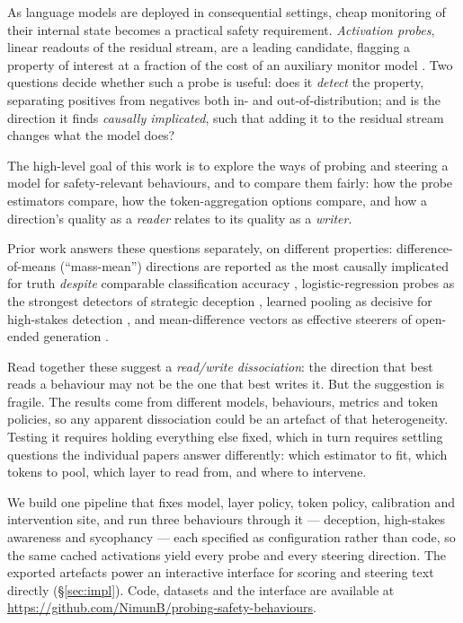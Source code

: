 \documentclass[conference]{IEEEtran}
\begin{document}
As language models are deployed in consequential settings, cheap monitoring of
their internal state becomes a practical safety requirement. \emph{Activation
probes}, linear readouts of the residual stream, are a leading candidate,
flagging a property of interest at a fraction of the cost of an auxiliary monitor
model \citep{alain2018,mckenzie2025}. Two questions decide whether such a probe is
useful: does it \emph{detect} the property, separating positives from negatives
both in- and out-of-distribution; and is the direction it finds
\emph{causally implicated}, such that adding it to the residual stream changes
what the model does?

The high-level goal of this work is to explore the ways of probing and steering
a model for safety-relevant behaviours, and to compare them fairly: how the
probe estimators compare, how the token-aggregation options compare, and how a
direction's quality as a \emph{reader} relates to its quality as a \emph{writer}.

Prior work answers these questions separately, on different properties:
difference-of-means (``mass-mean'') directions are reported as the most causally
implicated for truth \emph{despite} comparable classification accuracy
\citep{marks2024}, logistic-regression probes as the strongest detectors of
strategic deception \citep{goldowsky2025}, learned pooling as decisive for
high-stakes detection \citep{mckenzie2025}, and mean-difference vectors as
effective steerers of open-ended generation \citep{rimsky2024}.

Read together these suggest a \emph{read/write dissociation}: the direction that
best reads a behaviour may not be the one that best writes it. But the suggestion
is fragile. The results come from different models, behaviours, metrics and token
policies, so any apparent dissociation could be an artefact of that heterogeneity.
Testing it requires holding everything else fixed, which in turn requires settling
questions the individual papers answer differently: which estimator to fit, which
tokens to pool, which layer to read from, and where to intervene.

We build one pipeline that fixes model, layer policy, token policy, calibration
and intervention site, and run three behaviours through it --- deception,
high-stakes awareness and sycophancy --- each specified as configuration rather
than code, so the same cached activations yield every probe and every steering
direction. The exported artefacts power an interactive interface for scoring
and steering text directly (§\ref{sec:impl}). Code, datasets and the interface
are available at \url{https://github.com/NimunB/probing-safety-behaviours}.
\end{document}

